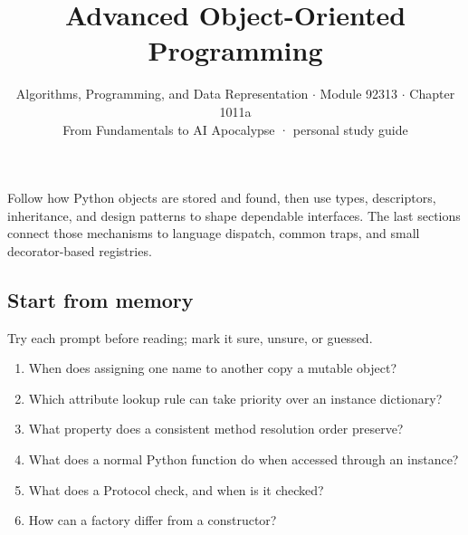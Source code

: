 \documentclass[11pt]{article}
\title{\sffamily\bfseries\color{FAUblue}Advanced Object-Oriented Programming}
\author{Algorithms, Programming, and Data Representation \ensuremath{\cdot} Module 92313 \ensuremath{\cdot} Chapter 1011a\\[2pt]\small From Fundamentals to AI Apocalypse · personal study guide}
\date{}
\begin{document}
\maketitle
\begingroup\footnotesize\setlength{\parskip}{0pt}\tableofcontents\endgroup
\clearpage

{\large Follow how Python objects are stored and found, then use types, descriptors, inheritance, and design patterns to shape dependable interfaces. The last sections connect those mechanisms to language dispatch, common traps, and small decorator-based registries.}


\begin{keepsection}
\section{Start from memory}

Try each prompt before reading; mark it sure, unsure, or guessed.

\begin{enumerate}
\item When does assigning one name to another copy a mutable object?
\item Which attribute lookup rule can take priority over an instance dictionary?
\item What property does a consistent method resolution order preserve?
\item What does a normal Python function do when accessed through an instance?
\item What does a Protocol check, and when is it checked?
\item How can a factory differ from a constructor?
\end{enumerate}

\end{keepsection}
\end{document}
